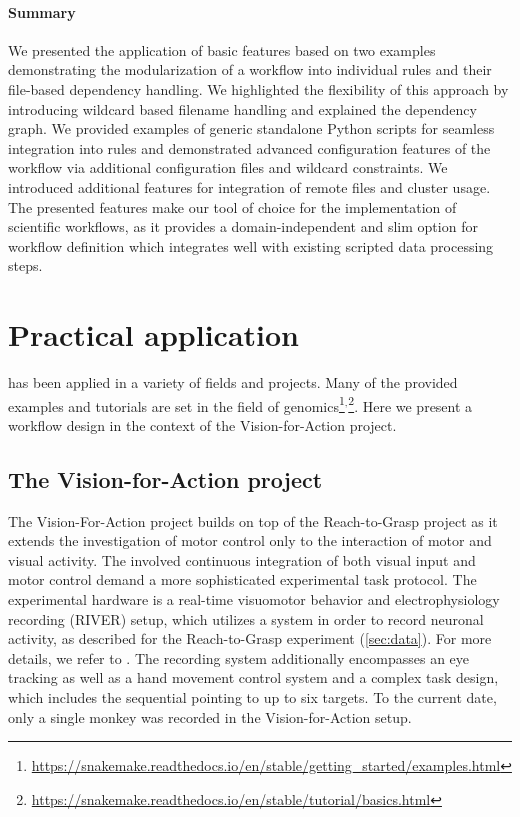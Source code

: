 \paragraph{Summary}
We presented the application of basic  features based on two examples demonstrating the modularization of a workflow into individual rules and their file-based dependency handling. We highlighted the flexibility of this approach by introducing wildcard based filename handling and explained the  dependency graph. We provided examples of generic standalone Python scripts for seamless integration into  rules and demonstrated advanced configuration features of the workflow via additional configuration files and wildcard constraints. We introduced additional features for integration of remote files and cluster usage.
The presented features make  our tool of choice for the implementation of scientific workflows, as it provides a domain-independent and slim option for workflow definition which integrates well with existing scripted data processing steps.


\section{Practical application}
 has been applied in a variety of fields and projects. Many of the provided examples and tutorials are set in the field of genomics\footnote{\url{https://snakemake.readthedocs.io/en/stable/getting_started/examples.html}}$^,$\footnote{\url{https://snakemake.readthedocs.io/en/stable/tutorial/basics.html}}. Here we present a workflow design in the context of the Vision-for-Action project.

\subsection{The Vision-for-Action project}
The Vision-For-Action project builds on top of the Reach-to-Grasp project as it extends the investigation of motor control only to the interaction of motor and visual activity. The involved continuous integration of both visual input and motor control demand a more sophisticated experimental task protocol. The experimental hardware is a real-time visuomotor behavior and electrophysiology recording (RIVER) setup, which utilizes a  system in order to record neuronal activity, as described for the Reach-to-Grasp experiment (\cref{sec:data}). For more details, we refer to \citet{deHaan_2018,deHaan_2018a}. The recording system additionally encompasses an eye tracking as well as a hand movement control system and a complex task design, which includes the sequential pointing to up to six targets. To the current date, only a single monkey was recorded in the Vision-for-Action setup.

